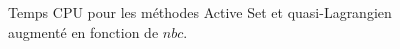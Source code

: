 \begin{figure}[ht!]
	\begin{center}
	\end{center}
	\caption{Temps CPU pour les méthodes Active Set et quasi-Lagrangien augmenté en fonction de $ nbc $.}
	\label{dynaelas_CPU}
\end{figure}


